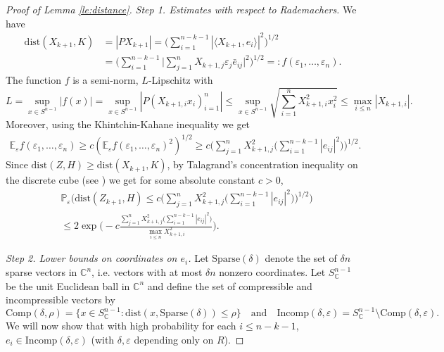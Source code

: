 \documentclass[12pt,reqno]{amsart}
\begin{document}
\begin{proof}[Proof of Lemma \ref{le:distance}]
  \noindent\textit{Step 1. Estimates with respect to Rademachers.} We
  have
\begin{align}\label{eq:basis_rep}
  {\mathrm{dist}}(X_{k+1},K)
  &= |P X_{k+1}| = \Big(\sum_{i=1}^{n-k-1} |\langle X_{k+1},e_i\rangle|^2\Big)^{1/2}\nonumber\\
  & = \Big(\sum_{i=1}^{n-k-1}\Big|\sum_{j=1}^n
  X_{k+1,j}\varepsilon_{j}\bar{e}_{ij}\Big|^2\Big)^{1/2}
   =: f(\varepsilon_1,\ldots,\varepsilon_n).
\end{align}
The function $f$ is a semi-norm, $L$-Lipschitz with
\[
  L = \sup_{x\in S^{n-1}} |f(x)| = \sup_{x\in S^{n-1}} |P (X_{k+1,i}x_i)_{i=1}^n| \le \sup_{x\in S^{n-1}} \sqrt{\sum_{i=1}^n X_{k+1,i}^2 x_i^2} \le \max_{i\le n}|X_{k+1,i}|.
\]
Moreover, using the Khintchin-Kahane inequality we get
\begin{align*}
  {\mathbb{E}}_\varepsilon f(\varepsilon_1,\ldots,\varepsilon_n) \ge c ({\mathbb{E}}_\varepsilon
  f(\varepsilon_1,\ldots,\varepsilon_n)^2)^{1/2} \ge c\Big(\sum_{j=1}^n
  X_{k+1,j}^2\Big(\sum_{i=1}^{n-k-1} |e_{ij}|^2\Big)\Big)^{1/2}.
\end{align*}
Since ${\mathrm{dist}}(Z,H) \ge {\mathrm{dist}}(X_{k+1},K)$, by Talagrand's concentration inequality on the discrete cube (see \cite{TalCube}) we get for some absolute constant $c> 0$,
\begin{align}\label{eq:conditional_estimate}
&{\mathbb{P}}_\varepsilon\Big( {\mathrm{dist}}(Z_{k+1},H) \le c \Big(\sum_{j=1}^n X_{k+1,j}^2\Big(\sum_{i=1}^{n-k-1} |e_{ij}|^2\Big)\Big)^{1/2}\Big) \nonumber\\
&\le 2\exp\bigg(-c \frac{\sum_{j=1}^n X_{k+1,j}^2\Big(\sum_{i=1}^{n-k-1} |e_{ij}|^2\Big)}{\max_{i\le n} X_{k+1,i}^2}\bigg).\
\end{align}

\medskip
\noindent\textit{Step 2. Lower bounds on coordinates on $e_i$.}
Let ${\mathrm{Sparse}}(\delta)$ denote the set of $\delta n$ sparse vectors in ${\mathbb{C}}^{n}$,
i.e. vectors with at most $\delta n$ nonzero coordinates. Let $S_{\mathbb{C}}^{n-1}$ be
the unit Euclidean ball in ${\mathbb{C}}^n$ and define the set of compressible and
incompressible vectors by
\[
{\mathrm{Comp}}(\delta,\rho) = \{x\in S_{\mathbb{C}}^{n-1}\colon {\mathrm{dist}}(x,{\mathrm{Sparse}}(\delta)) \le \rho\} \quad\text{and}\quad {\mathrm{Incomp}}(\delta,\varepsilon) = S_{\mathbb{C}}^{n-1} \setminus {\mathrm{Comp}}(\delta,\varepsilon).
\]
We will now show that with high probability for each $i\le n- k - 1$, $e_i \in
{\mathrm{Incomp}}(\delta,\varepsilon)$ (with $\delta,\varepsilon$ depending only on
$R$).


\end{proof}
\end{document}
